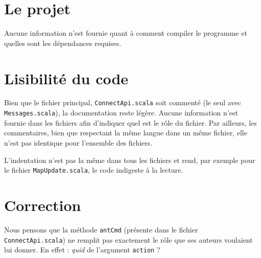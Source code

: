 \documentclass[a4paper, 12pt]{article}
\begin{document}
\section*{Le projet}
Aucune information n'est fournie quant à comment compiler le programme et quelles
 sont les dépendances requises.

\section*{Lisibilité du code}
Bien que le fichier principal, \verb+ConnectApi.scala+ soit commenté (le seul
 avec \verb+Messages.scala+), la documentation reste légère. Aucune information
 n'est fournie dans les fichiers afin d'indiquer quel est le rôle du fichier. Par
 ailleurs, les commentaires, bien que respectant la même langue dans un même
 fichier, elle n'est pas identique pour l'ensemble des fichiers.

L'indentation n'est pas la même dans tous les fichiers et rend, par exemple pour
 le fichier \verb+MapUpdate.scala+, le code indigeste à la lecture.

\section*{Correction}
Nous pensons que la méthode \verb+antCmd+ (présente dans le fichier
 \verb+ConnectApi.scala+) ne remplit pas exactement le rôle que ses auteurs
 voulaient lui donner. En effet : \textit{quid} de l'argument \verb+action+ ?
\end{document}
